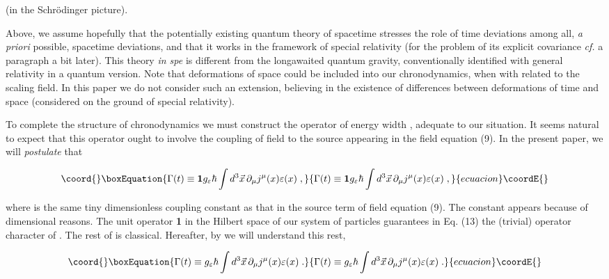 \documentclass[a4paper,12pt]{article}
\begin{document}
\ni (in the Schr\"{o}dinger picture).

Above, we assume hopefully that the potentially existing quantum theory of spacetime stresses the role of time deviations among all, {\it a priori} possible, spacetime deviations, and that it works in the framework of special relativity (for the problem of its explicit covariance {\it cf.} a paragraph a bit later). This theory {\it in spe} is different from the long\-awaited quantum gravity, conventionally identified with general relativity in a quantum version. Note that deformations of space could be included into our chronodynamics, when \coordHE{} with \coordHE{} related to the scaling field. In this paper we do not consider such an extension, believing in the existence of differences between deformations of time and space (considered on the ground of special relativity).

To complete the structure of chronodynamics we must construct the operator of energy width \myHighlight{$\Gamma $}\coordHE{}, adequate to our situation. It seems natural to expect that this operator ought to involve the coupling of field \coordHE{} to the source \coordHE{} appearing in the field equation (9). In the present paper, we will {\it postulate} that 

\begin{equation}\coord{}\boxEquation{
\Gamma(t) \equiv {\bf 1} g_\varepsilon \hbar \int d^3\vec{x}\,\partial_\mu j^\mu(x) \varepsilon(x)\;, 
}{
\Gamma(t) \equiv {\bf 1} g_\varepsilon \hbar \int d^3\vec{x}\,\partial_\mu j^\mu(x) \varepsilon(x)\;, 
}{ecuacion}\coordE{}\end{equation}

\ni where \coordHE{} is the same tiny dimensionless coupling constant as that in the source term of field equation (9). The constant \myHighlight{$\hbar$}\coordHE{} appears because of dimensional reasons. The unit operator {\bf 1} in the Hilbert space of our system of particles guarantees in Eq. (13) the (trivial) operator character of \coordHE{}. The rest of \coordHE{} is classical. Hereafter, by \coordHE{}  we will understand this rest,

\begin{equation}\coord{}\boxEquation{
\Gamma (t) \equiv g_\varepsilon \hbar \int d^3\vec{x}\,\partial_\mu j^\mu(x) \varepsilon(x)\;.
}{
\Gamma (t) \equiv g_\varepsilon \hbar \int d^3\vec{x}\,\partial_\mu j^\mu(x) \varepsilon(x)\;.
}{ecuacion}\coordE{}\end{equation}
\end{document}
